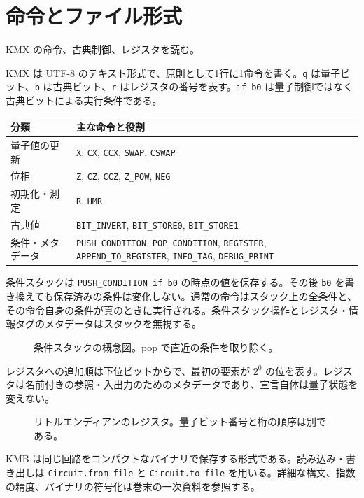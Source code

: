 \documentclass[a4paper,11pt,oneside,openany]{ltjsbook}
\newcommand{\code}[1]{\nolinkurl{#1}}
\begin{document}
\chapter{命令とファイル形式}
\begin{goal}KMX の命令、古典制御、レジスタを読む。\end{goal}
KMX は UTF-8 のテキスト形式で、原則として1行に1命令を書く。\code{q} は量子ビット、\code{b} は古典ビット、\code{r} はレジスタの番号を表す。\code{if b0} は量子制御ではなく古典ビットによる実行条件である。
\begin{center}\begin{tabularx}{\textwidth}{lX}\toprule 分類 & 主な命令と役割\\\midrule
量子値の更新 & \code{X}, \code{CX}, \code{CCX}, \code{SWAP}, \code{CSWAP}\\
位相 & \code{Z}, \code{CZ}, \code{CCZ}, \code{Z_POW}, \code{NEG}\\
初期化・測定 & \code{R}, \code{HMR}\\
古典値 & \code{BIT_INVERT}, \code{BIT_STORE0}, \code{BIT_STORE1}\\
条件・メタデータ & \code{PUSH_CONDITION}, \code{POP_CONDITION}, \code{REGISTER}, \code{APPEND_TO_REGISTER}, \code{INFO_TAG}, \code{DEBUG_PRINT}\\\bottomrule\end{tabularx}\end{center}
条件スタックは \code{PUSH_CONDITION if b0} の時点の値を保存する。その後 \code{b0} を書き換えても保存済みの条件は変化しない。通常の命令はスタック上の全条件と、その命令自身の条件が真のときに実行される。条件スタック操作とレジスタ・情報タグのメタデータはスタックを無視する。
\begin{figure}[htbp]\centering
{}\caption{条件スタックの概念図。pop で直近の条件を取り除く。}\end{figure}
レジスタへの追加順は下位ビットからで、最初の要素が $2^0$ の位を表す。レジスタは名前付きの参照・入出力のためのメタデータであり、宣言自体は量子状態を変えない。
\begin{figure}[htbp]\centering
{}\caption{リトルエンディアンのレジスタ。量子ビット番号と桁の順序は別である。}\end{figure}
KMB は同じ回路をコンパクトなバイナリで保存する形式である。読み込み・書き出しは \code{Circuit.from_file} と \code{Circuit.to_file} を用いる。詳細な構文、指数の精度、バイナリの符号化は巻末の一次資料を参照する。
\end{document}
